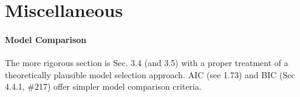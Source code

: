 \documentclass[a4paper]{article}
\begin{document}
\clearpage
\newpage

\section*{Miscellaneous}
\paragraph*{Model Comparison} The more rigorous section is Sec. 3.4 (and 3.5) with a proper treatment of a theoretically plausible model selection approach. AIC (see 1.73) and BIC (Sec 4.4.1, \#217) offer simpler model comparison criteria.




\end{document}
